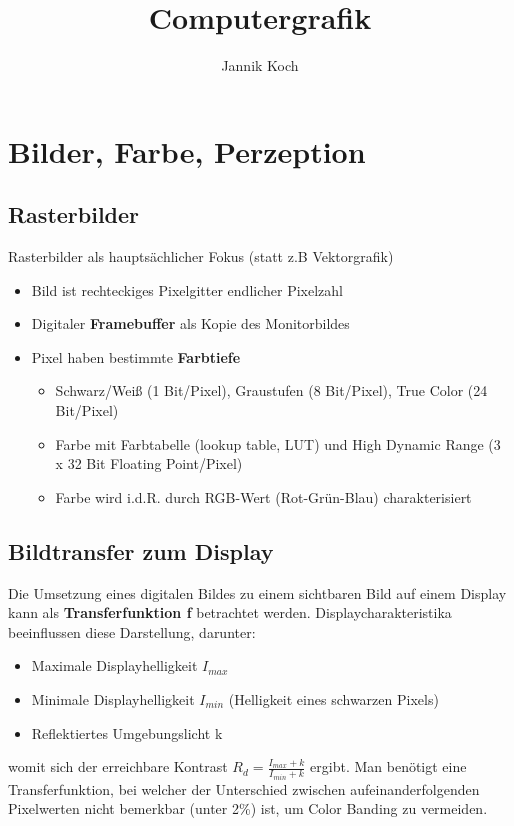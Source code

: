 \documentclass[10pt,a4paper]{article}
\author{Jannik Koch}
\title{Computergrafik}
\begin{document}
	{\let\newpage\relax\maketitle}
	\tableofcontents
	\newpage
	\setcounter{page}{1}

	\section{Bilder, Farbe, Perzeption}
	\label{sec:bilder_farbe_perzeption}
	
	\subsection{Rasterbilder}
	\label{sub:rasterbilder}

	Rasterbilder als hauptsächlicher Fokus (statt z.B Vektorgrafik)
	\begin{itemize}
		\item Bild ist rechteckiges Pixelgitter endlicher Pixelzahl
		\item Digitaler \textbf{Framebuffer} als Kopie des Monitorbildes
		\item Pixel haben bestimmte \textbf{Farbtiefe}
		\begin{itemize}
			\item Schwarz/Weiß (1 Bit/Pixel), Graustufen (8 Bit/Pixel), True Color (24 Bit/Pixel)
			\item Farbe mit Farbtabelle (lookup table, \glqq LUT\grqq) und High Dynamic Range (3 x 32 Bit Floating Point/Pixel)
			\item Farbe wird i.d.R. durch RGB-Wert (Rot-Grün-Blau) charakterisiert
		\end{itemize}
	\end{itemize}

	\subsection{Bildtransfer zum Display}
	\label{sub:bildtransfer_zum_display}

	Die Umsetzung eines digitalen Bildes zu einem sichtbaren Bild auf einem Display kann als \textbf{Transferfunktion f} betrachtet werden. Displaycharakteristika beeinflussen diese Darstellung, darunter:
	\begin{itemize}
		\item Maximale Displayhelligkeit $I_{max}$
		\item Minimale Displayhelligkeit $I_{min}$ (Helligkeit eines schwarzen Pixels)
		\item Reflektiertes Umgebungslicht k
	\end{itemize}
	womit sich der erreichbare Kontrast $R_d = \frac{I_{max} + k}{I_{min} + k}$ ergibt. Man benötigt eine Transferfunktion, bei welcher der Unterschied zwischen aufeinanderfolgenden Pixelwerten nicht bemerkbar (unter 2\%) ist, um Color Banding zu vermeiden.
\end{document}
